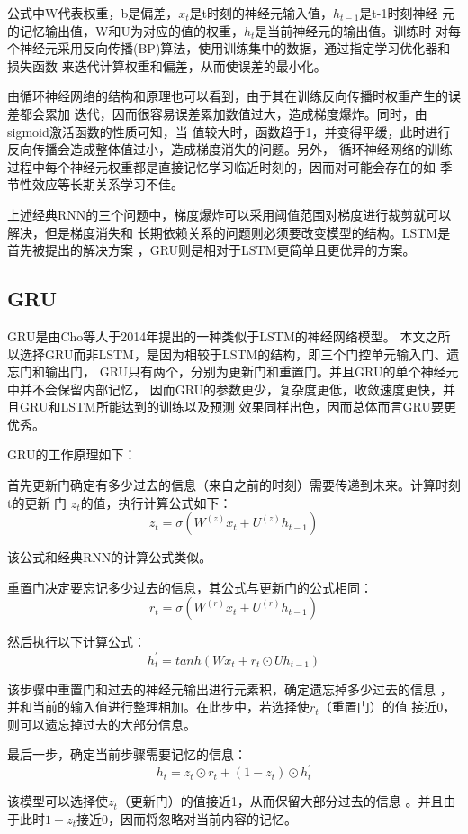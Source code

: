 \documentclass[AutoFakeBold]{LZUThesis}
\begin{document}
公式中W代表权重，b是偏差，$x_t$是t时刻的神经元输入值，$h_{t-1}$是t-1时刻神经
元的记忆输出值，W和U为对应的值的权重，$h_t$是当前神经元的输出值。训练时
对每个神经元采用反向传播(BP)算法，使用训练集中的数据，通过指定学习优化器和损失函数
来迭代计算权重和偏差，从而使误差的最小化。

由循环神经网络的结构和原理也可以看到，由于其在训练反向传播时权重产生的误差都会累加
迭代，因而很容易误差累加数值过大，造成梯度爆炸。同时，由sigmoid激活函数的性质可知，当
值较大时，函数趋于1，并变得平缓，此时进行反向传播会造成整体值过小，造成梯度消失的问题。另外，
循环神经网络的训练过程中每个神经元权重都是直接记忆学习临近时刻的，因而对可能会存在的如
季节性效应等长期关系学习不佳。

上述经典RNN的三个问题中，梯度爆炸可以采用阈值范围对梯度进行裁剪就可以解决，但是梯度消失和
长期依赖关系的问题则必须要改变模型的结构。LSTM是首先被提出的解决方案
，GRU则是相对于LSTM更简单且更优异的方案。

\subsection{GRU}
GRU是由Cho等人于2014年提出的一种类似于LSTM的神经网络模型。
本文之所以选择GRU而非LSTM，是因为相较于LSTM的结构，即三个门控单元输入门、遗忘门和输出门，
GRU只有两个，分别为更新门和重置门。并且GRU的单个神经元中并不会保留内部记忆，
因而GRU的参数更少，复杂度更低，收敛速度更快，并且GRU和LSTM所能达到的训练以及预测
效果同样出色，因而总体而言GRU要更优秀。

GRU的工作原理如下：

首先更新门确定有多少过去的信息（来自之前的时刻）需要传递到未来。计算时刻t的更新
门 $z_t$的值，执行计算公式如下：
$$z_t=\sigma(W^{(z)}x_t+U^{(z)}h_{t-1})$$

该公式和经典RNN的计算公式类似。

重置门决定要忘记多少过去的信息，其公式与更新门的公式相同：
$$r_t=\sigma(W^{(r)}x_t+U^{(r)}h_{t-1})$$

然后执行以下计算公式：
$$h^{\prime}_t=tanh(Wx_t+r_t\odot Uh_{t-1})$$

该步骤中重置门和过去的神经元输出进行元素积，确定遗忘掉多少过去的信息
，并和当前的输入值进行整理相加。在此步中，若选择使$r_t$（重置门）的值
接近0，则可以遗忘掉过去的大部分信息。

最后一步，确定当前步骤需要记忆的信息：
$$h_t=z_t\odot r_t+(1-z_t)\odot h^{\prime}_t$$

该模型可以选择使$z_t$（更新门）的值接近1，从而保留大部分过去的信息
。并且由于此时$1-z_t$接近0，因而将忽略对当前内容的记忆。
\end{document}
